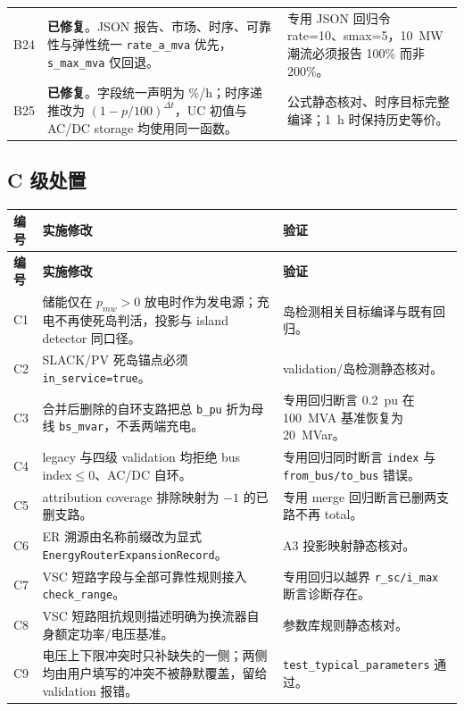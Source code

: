 \documentclass[11pt,a4paper,fontset=fandol]{ctexart}
\newcommand{\file}[1]{\texttt{#1}}
\newcommand{\fixed}{\textcolor{hygreen}{\textbf{已修复}}}
\begin{document}
\begin{footnotesize}
\begin{longtable}{@{}p{0.7cm}p{8.4cm}p{6.0cm}@{}}
B24 & \fixed{}。JSON 报告、市场、时序、可靠性与弹性统一 \file{rate\_a\_mva} 优先，\file{s\_max\_mva} 仅回退。 & 专用 JSON 回归令 rate=10、smax=5，10~MW 潮流必须报告 100\% 而非 200\%。\\
B25 & \fixed{}。字段统一声明为 \%/h；时序递推改为 $(1-p/100)^{\Delta t}$，UC 初值与 AC/DC storage 均使用同一函数。 & 公式静态核对、时序目标完整编译；1~h 时保持历史等价。\\
\bottomrule
\end{longtable}
\end{footnotesize}

\subsection{C 级处置}

\begin{footnotesize}
\begin{longtable}{@{}p{0.7cm}p{8.4cm}p{6.0cm}@{}}
\toprule
\textbf{编号} & \textbf{实施修改} & \textbf{验证}\\
\midrule
\endfirsthead
\toprule
\textbf{编号} & \textbf{实施修改} & \textbf{验证}\\
\midrule
\endhead
C1 & 储能仅在 $p_{mw}>0$ 放电时作为发电源；充电不再使死岛判活，投影与 island detector 同口径。 & 岛检测相关目标编译与既有回归。\\
C2 & SLACK/PV 死岛锚点必须 \file{in\_service=true}。 & validation/岛检测静态核对。\\
C3 & 合并后删除的自环支路把总 \file{b\_pu} 折为母线 \file{bs\_mvar}，不丢两端充电。 & 专用回归断言 0.2~pu 在 100~MVA 基准恢复为 20~MVar。\\
C4 & legacy 与四级 validation 均拒绝 bus index$\le0$、AC/DC 自环。 & 专用回归同时断言 \file{index} 与 \file{from\_bus/to\_bus} 错误。\\
C5 & attribution coverage 排除映射为 $-1$ 的已删支路。 & 专用 merge 回归断言已删两支路不再 total。\\
C6 & ER 溯源由名称前缀改为显式 \file{EnergyRouterExpansionRecord}。 & A3 投影映射静态核对。\\
C7 & VSC 短路字段与全部可靠性规则接入 \file{check\_range}。 & 专用回归以越界 \file{r\_sc/i\_max} 断言诊断存在。\\
C8 & VSC 短路阻抗规则描述明确为换流器自身额定功率/电压基准。 & 参数库规则静态核对。\\
C9 & 电压上下限冲突时只补缺失的一侧；两侧均由用户填写的冲突不被静默覆盖，留给 validation 报错。 & \file{test\_typical\_parameters} 通过。\\

\end{longtable}
\end{footnotesize}
\end{document}
